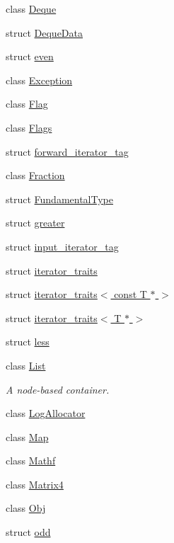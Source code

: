 \begin{DoxyCompactItemize}
\item 
class \hyperlink{classprism_1_1_deque}{Deque}
\item 
struct \hyperlink{structprism_1_1_deque_data}{Deque\+Data}
\item 
struct \hyperlink{structprism_1_1even}{even}
\item 
class \hyperlink{classprism_1_1_exception}{Exception}
\item 
class \hyperlink{classprism_1_1_flag}{Flag}
\item 
class \hyperlink{classprism_1_1_flags}{Flags}
\item 
struct \hyperlink{structprism_1_1forward__iterator__tag}{forward\+\_\+iterator\+\_\+tag}
\item 
class \hyperlink{classprism_1_1_fraction}{Fraction}
\item 
struct \hyperlink{structprism_1_1_fundamental_type}{Fundamental\+Type}
\item 
struct \hyperlink{structprism_1_1greater}{greater}
\item 
struct \hyperlink{structprism_1_1input__iterator__tag}{input\+\_\+iterator\+\_\+tag}
\item 
struct \hyperlink{structprism_1_1iterator__traits}{iterator\+\_\+traits}
\item 
struct \hyperlink{structprism_1_1iterator__traits_3_01const_01_t_01_5_01_4}{iterator\+\_\+traits$<$ const T $\ast$ $>$}
\item 
struct \hyperlink{structprism_1_1iterator__traits_3_01_t_01_5_01_4}{iterator\+\_\+traits$<$ T $\ast$ $>$}
\item 
struct \hyperlink{structprism_1_1less}{less}
\item 
class \hyperlink{classprism_1_1_list}{List}
\begin{DoxyCompactList}\small\item\em A node-\/based container. \end{DoxyCompactList}\item 
class \hyperlink{classprism_1_1_log_allocator}{Log\+Allocator}
\item 
class \hyperlink{classprism_1_1_map}{Map}
\item 
class \hyperlink{classprism_1_1_mathf}{Mathf}
\item 
class \hyperlink{classprism_1_1_matrix4}{Matrix4}
\item 
class \hyperlink{classprism_1_1_obj}{Obj}
\item 
struct \hyperlink{structprism_1_1odd}{odd}
\item 

\end{DoxyCompactItemize}
